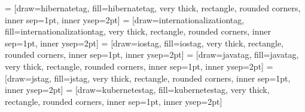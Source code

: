 \newcommand{\githubactionstag}{\begin{tikzpicture}\node [githubactionstag] (box){{\scriptsize \textbf{\phantom{|}Github Actions\phantom{|}}}};\end{tikzpicture}}
 = [draw=hibernatetag, fill=hibernatetag, very thick, rectangle, rounded corners, inner sep=1pt, inner ysep=2pt]
\newcommand{\hibernatetag}{\begin{tikzpicture}\node [hibernatetag] (box){{\scriptsize \textbf{\phantom{|}Hibernate\phantom{|}}}};\end{tikzpicture}}
 = [draw=internationalizationtag, fill=internationalizationtag, very thick, rectangle, rounded corners, inner sep=1pt, inner ysep=2pt]
\newcommand{\internationalizationtag}{\begin{tikzpicture}\node [internationalizationtag] (box){{\scriptsize \color{white}{\textbf{\phantom{|}i18n\phantom{|}}}}};\end{tikzpicture}}
 = [draw=iostag, fill=iostag, very thick, rectangle, rounded corners, inner sep=1pt, inner ysep=2pt]
\newcommand{\iostag}{\begin{tikzpicture}\node [iostag] (box){{\scriptsize \textbf{\phantom{|}iOS\phantom{|}}}};\end{tikzpicture}}
 = [draw=javatag, fill=javatag, very thick, rectangle, rounded corners, inner sep=1pt, inner ysep=2pt]
\newcommand{\javatag}{\begin{tikzpicture}\node [javatag] (box){{\scriptsize \textbf{\phantom{|}Java\phantom{|}}}};\end{tikzpicture}}
 = [draw=jstag, fill=jstag, very thick, rectangle, rounded corners, inner sep=1pt, inner ysep=2pt]
\newcommand{\jstag}{\begin{tikzpicture}\node [jstag] (box){{\scriptsize \color{darkgray}{\textbf{\phantom{|}JS\phantom{|}}}}};\end{tikzpicture}}
 = [draw=kubernetestag, fill=kubernetestag, very thick, rectangle, rounded corners, inner sep=1pt, inner ysep=2pt]
\newcommand{\kubernetestag}{\begin{tikzpicture}\node [kubernetestag] (box){{\scriptsize \color{white}{\textbf{\phantom{|}Kubernetes\phantom{|}}}}};\end{tikzpicture}}

